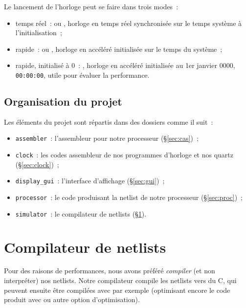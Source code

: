 \documentclass[11pt,a4paper]{article}
\newcommand{\relire}{}
\newcommand{\relu}[1]{}
\begin{document}
\noindent Le lancement de l'horloge peut se faire dans trois modes~:
\begin{itemize}
\item temps réel~:  ou , horloge en temps réel synchronisée sur le temps système à l'initialisation~;
\item rapide~:  ou , horloge en accéléré initialisée sur le temps du système~;
\item rapide, initialisé à 0~: , horloge en accéléré initialisée au 1er janvier 0000, \verb!00:00:00!, utile pour évaluer la performance.
\end{itemize}

\subsection{Organisation du projet}

Les éléments du projet sont répartis dans des dossiers comme il suit~:
\begin{itemize}
\item \texttt{assembler}~: l'assembleur pour notre processeur (§\ref{sec:cas})~;
\item \texttt{clock}~: les codes assembleur de nos programmes d'horloge et nos quartz (§\ref{sec:clock})~;
\item \texttt{display\_gui}~: l'interface d'affichage (§\ref{sec:gui})~;
\item \texttt{processor}~: le code produisant la netlist de notre processeur (§\ref{sec:proc})~;
\item \texttt{simulator}~: le compilateur de netlists (§\ref{sec:compilo}).
\end{itemize}

\section{Compilateur de netlists} \label{sec:compilo}

\relire
\relu{Théo}

Pour des raisons de performances, nous avons préféré \emph{compiler} (et non interpréter) nos netlists. Notre compilateur compile les netlists vers du C, qui peuvent ensuite être compilées avec  par exemple (optimisant encore le code produit avec  ou autre option d'optimisation).
\end{document}
